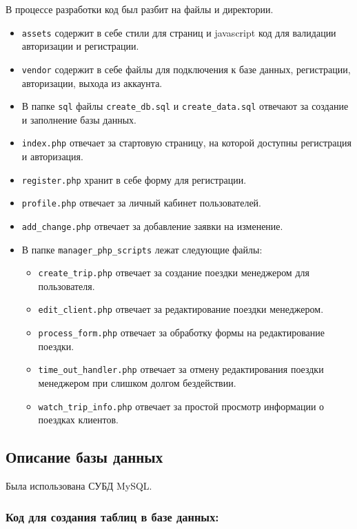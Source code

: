 \documentclass[a4paper,12pt]{article}
\begin{document}
В процессе разработки код был разбит на файлы и директории.

\begin{itemize}
    \item \texttt{assets} содержит в себе стили для страниц и javascript код для валидации авторизации и регистрации.
    \item \texttt{vendor} содержит в себе файлы для подключения к базе данных, регистрации, авторизации, выхода из аккаунта.
    \item В папке \texttt{sql} файлы \texttt{create\_db.sql} и \texttt{create\_data.sql} отвечают за создание и заполнение базы данных.
    \item \texttt{index.php} отвечает за стартовую страницу, на которой доступны регистрация и авторизация.
    \item \texttt{register.php} хранит в себе форму для регистрации.
    \item \texttt{profile.php} отвечает за личный кабинет пользователей.
    \item \texttt{add\_change.php} отвечает за добавление заявки на изменение.
    \item В папке \texttt{manager\_php\_scripts} лежат следующие файлы:
          \begin{itemize}
              \item \texttt{create\_trip.php} отвечает за создание поездки менеджером для пользователя.
              \item \texttt{edit\_client.php} отвечает за редактирование поездки менеджером.
              \item \texttt{process\_form.php} отвечает за обработку формы на редактирование поездки.
              \item \texttt{time\_out\_handler.php} отвечает за отмену редактирования поездки менеджером при слишком долгом бездействии.
              \item \texttt{watch\_trip\_info.php} отвечает за простой просмотр информации о поездках клиентов.
          \end{itemize}
\end{itemize}

\subsection{Описание базы данных}

Была использована СУБД MySQL.

\subsubsection{Код для создания таблиц в базе данных:}
\end{document}
